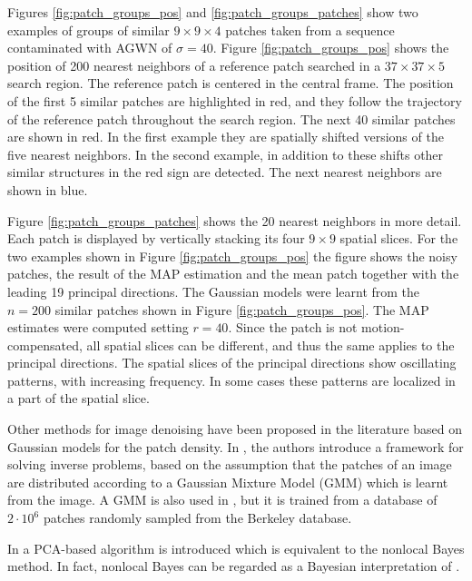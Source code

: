 \documentclass[10pt, journal, twocolumn, final, a4paper]{IEEEtran}
\begin{document}
Figures \ref{fig:patch_groups_pos} and \ref{fig:patch_groups_patches}
show two examples of groups of similar $9\times 9\times 4$ patches taken from
a sequence contaminated with AGWN of $\sigma = 40$. Figure
\ref{fig:patch_groups_pos} shows the position of 200 nearest neighbors of a
reference patch searched in a $37\times 37\times 5$ search region. The
reference patch is centered in the central frame. The position of the first 5
similar patches are highlighted in red, and they follow the trajectory of the
reference patch throughout the search region.  The next 40 similar patches are
shown in red. In the first example they are spatially shifted versions of the
five nearest neighbors. In the second example, in addition to these shifts
other similar structures in the red sign are detected.  The next nearest
neighbors are shown in blue.

Figure \ref{fig:patch_groups_patches} shows the 20 nearest neighbors in 
more detail. Each patch is displayed by vertically stacking its four $9\times
9$ spatial slices. For the two examples shown in Figure \ref{fig:patch_groups_pos}
the figure shows the noisy patches, the result of the MAP estimation and the
mean patch together with the leading 19 principal directions. The Gaussian
models were learnt from the $n = 200$ similar patches shown in Figure
\ref{fig:patch_groups_pos}. The MAP estimates were computed setting $r = 40$.
Since the patch is not
motion-compensated, all spatial slices can be different,
and thus the same applies to the principal directions.
The spatial slices of the principal directions show oscillating patterns, with
increasing frequency. In some cases these patterns are localized in a part of
the spatial slice.



\bigskip

Other methods for image denoising have been proposed in the
literature based on Gaussian models for the patch density. In \cite{Yu2012},
the authors introduce a framework for solving inverse problems, based on the
assumption that the patches of an image are distributed according to a Gaussian
Mixture Model (GMM) which is learnt from
the image. A GMM is also used in \cite{Zoran2011}, but it is trained from a
database of $2\cdot 10^6$ patches randomly sampled from the Berkeley database.

In \cite{Zhang2010} a PCA-based algorithm is introduced which is equivalent to 
the nonlocal Bayes method. In fact, nonlocal Bayes can be regarded as a Bayesian 
interpretation of \cite{Zhang2010}.
\end{document}
